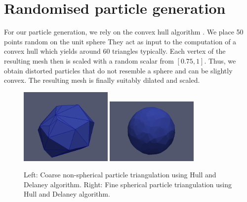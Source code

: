 \section{Randomised particle generation}
\label{section:randomised-particle-generation}

For our particle generation, we rely on the convex hull algorithm
\cite{mattutis,3,5}.
We place 50 points random on the unit sphere
They act as input to the computation of a convex hull which yields around 60
triangles typically.
Each vertex of the resulting mesh then is scaled with a random scalar from
$[0.75,1]$.
Thus, we obtain distorted particles that do not resemble a sphere and can be
slightly convex.
The resulting mesh is finally suitably dilated and scaled.

\begin{figure}
  \begin{center}
    \includegraphics[width=0.4\textwidth]{sketches/coarse.png}
    \hspace{0.2cm}
    \includegraphics[width=0.4\textwidth]{sketches/fine.png}
  \end{center}
  \caption{
    Left: Coarse non-spherical particle triangulation using Hull and Delaney algorithm.
    Right: Fine spherical particle triangulation using Hull and Delaney algorithm. 
  }
  \label{figure:particle_hull}
\end{figure}

